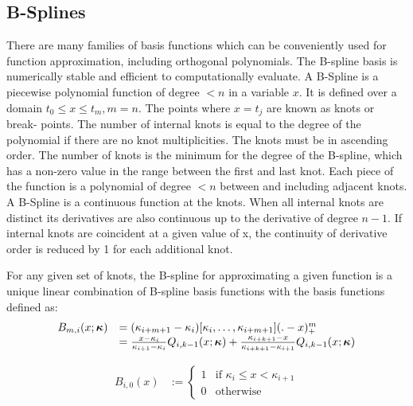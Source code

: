 \subsection{B-Splines}

There are many families of basis functions which can be conveniently used for function approximation,
including orthogonal polynomials. The B-spline basis \citep{DeBoor1972} is numerically stable and efficient to
computationally evaluate. A B-Spline is a piecewise polynomial function of degree $< n$ in a variable $x$. It
is defined over a domain $t_0 \leq x \leq t_m, m=n$. The points where $x = t_j$ are known as knots or break-
points. The number of internal knots is equal to the degree of the polynomial if there are no knot
multiplicities. The knots must be in ascending order. The number of knots is the minimum for the degree of the
B-spline, which has a non-zero value in the range between the first and last knot. Each piece of the function
is a polynomial of degree $< n$ between and including adjacent knots. A B-Spline is a continuous function at
the knots. When all internal knots are distinct its derivatives are also continuous up to the derivative of
degree $n - 1$. If internal knots are coincident at a given value of x, the continuity of derivative order is
reduced by 1 for each additional knot.

For any given set of knots, the B-spline for approximating a given function is a unique linear combination
of B-spline basis functions with the basis functions defined as:
$$
\begin{array}{rl}
	B_{m, i}(x; {\boldsymbol \kappa}) &= (\kappa_{i + m  + 1} - \kappa_{i})[\kappa_i, \ldots, \kappa_{i + m + 1}](. - x)^m_+ \\
	&= \frac{x - \kappa_i}{\kappa_{i + 1} - \kappa_i} Q_{i, k-1} (x; {\boldsymbol \kappa}) + 
										\frac{\kappa_{i + k + 1} - x}{\kappa_{i + k + 1} - \kappa_{i + 1}} Q_{i, k-1} (x; {\boldsymbol \kappa})
\end{array}
$$

\begin{align*}
	B_{i, 0}(x) & := \begin{cases}                                                                                                        
	1           & \text{if } \kappa_i \leq x < \kappa_{i+1}                                                                                         \\
	0           & \text{otherwise}                                                                                                        
	\end{cases}
\end{align*}

